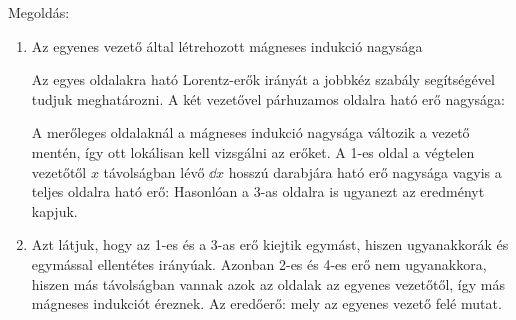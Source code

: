 
\ifdefined\megoldas

 Megoldás: 

 \begin{enumerate}[label=\alph*),itemsep=0pt]
  \item 
   Az egyenes vezető által létrehozott mágneses indukció nagysága
   
   Az egyes oldalakra ható Lorentz-erők irányát a jobbkéz szabály segítségével tudjuk meghatározni. A két vezetővel párhuzamos oldalra ható erő nagysága:
   
   A merőleges oldalaknál a mágneses indukció nagysága változik a vezető mentén, így ott lokálisan kell vizsgálni az erőket. A 1-es oldal a végtelen vezetőtől $x$ távolságban lévő $\dd x$ hosszú darabjára ható erő nagysága
   vagyis a teljes oldalra ható erő:
   Hasonlóan a 3-as oldalra is ugyanezt az eredményt kapjuk.
   
  \item
   Azt látjuk, hogy az 1-es és a 3-as erő kiejtik egymást, hiszen ugyanakkorák és egymással ellentétes irányúak. Azonban 2-es és 4-es erő nem ugyanakkora, hiszen más távolságban vannak azok az oldalak az egyenes vezetőtől, így más mágneses indukciót éreznek. Az eredőerő:
   mely az egyenes vezető felé mutat.
 \end{enumerate}

\fi